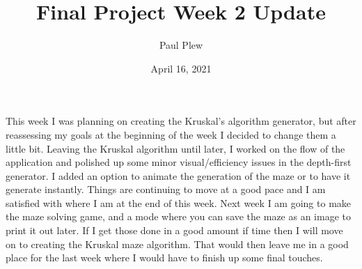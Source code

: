 \documentclass[12 pt]{article}
\title{Final Project Week 2 Update}
\author{Paul Plew}
\date{April 16, 2021}
\begin{document}
\maketitle
\indent This week I was planning on creating the Kruskal's algorithm generator, but after reassessing my goals at the beginning of the week I decided to change them a little bit. Leaving the Kruskal algorithm until later, I worked on the flow of the application and polished up some minor visual/efficiency issues in the depth-first generator. I added an option to animate the generation of the maze or to have it generate instantly. Things are continuing to move at a good pace and I am satisfied with where I am at the end of this week. Next week I am going to make the maze solving game, and a mode where you can save the maze as an image to print it out later. If I get those done in a good amount if time then I will move on to creating the Kruskal maze algorithm. That would then leave me in a good place for the last week where I would have to finish up some final touches.
\end{document}
